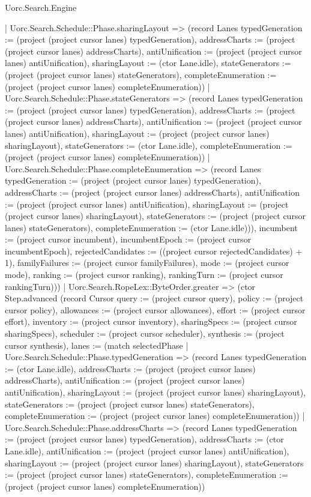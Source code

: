 \begin{lexlean}{Uorc.Search.Engine}
\begin{semanticmodule}
{{          | Uorc.Search.Schedule::Phase.sharingLayout => (record Lanes {typedGeneration := (project (project cursor lanes) typedGeneration), addressCharts := (project (project cursor lanes) addressCharts), antiUnification := (project (project cursor lanes) antiUnification), sharingLayout := (ctor Lane.idle), stateGenerators := (project (project cursor lanes) stateGenerators), completeEnumeration := (project (project cursor lanes) completeEnumeration)})
          | Uorc.Search.Schedule::Phase.stateGenerators => (record Lanes {typedGeneration := (project (project cursor lanes) typedGeneration), addressCharts := (project (project cursor lanes) addressCharts), antiUnification := (project (project cursor lanes) antiUnification), sharingLayout := (project (project cursor lanes) sharingLayout), stateGenerators := (ctor Lane.idle), completeEnumeration := (project (project cursor lanes) completeEnumeration)})
          | Uorc.Search.Schedule::Phase.completeEnumeration => (record Lanes {typedGeneration := (project (project cursor lanes) typedGeneration), addressCharts := (project (project cursor lanes) addressCharts), antiUnification := (project (project cursor lanes) antiUnification), sharingLayout := (project (project cursor lanes) sharingLayout), stateGenerators := (project (project cursor lanes) stateGenerators), completeEnumeration := (ctor Lane.idle)})), incumbent := (project cursor incumbent), incumbentEpoch := (project cursor incumbentEpoch), rejectedCandidates := ((project cursor rejectedCandidates) + 1), familyFailures := (project cursor familyFailures), mode := (project cursor mode), ranking := (project cursor ranking), rankingTurn := (project cursor rankingTurn)}))
        | Uorc.Search.RopeLex::ByteOrder.greater => (ctor Step.advanced (record Cursor {query := (project cursor query), policy := (project cursor policy), allowances := (project cursor allowances), effort := (project cursor effort), inventory := (project cursor inventory), sharingSpecs := (project cursor sharingSpecs), scheduler := (project cursor scheduler), synthesis := (project cursor synthesis), lanes := (match selectedPhase
          | Uorc.Search.Schedule::Phase.typedGeneration => (record Lanes {typedGeneration := (ctor Lane.idle), addressCharts := (project (project cursor lanes) addressCharts), antiUnification := (project (project cursor lanes) antiUnification), sharingLayout := (project (project cursor lanes) sharingLayout), stateGenerators := (project (project cursor lanes) stateGenerators), completeEnumeration := (project (project cursor lanes) completeEnumeration)})
          | Uorc.Search.Schedule::Phase.addressCharts => (record Lanes {typedGeneration := (project (project cursor lanes) typedGeneration), addressCharts := (ctor Lane.idle), antiUnification := (project (project cursor lanes) antiUnification), sharingLayout := (project (project cursor lanes) sharingLayout), stateGenerators := (project (project cursor lanes) stateGenerators), completeEnumeration := (project (project cursor lanes) completeEnumeration)})
}}
\end{semanticmodule}
\end{lexlean}
